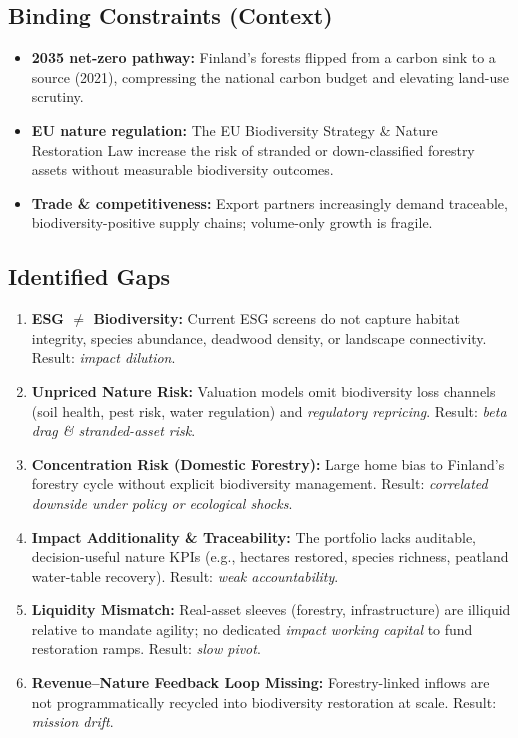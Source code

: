 \subsection*{Binding Constraints (Context)}
\begin{itemize}[leftmargin=*, itemsep=2pt]
    \item \textbf{2035 net-zero pathway:} Finland’s forests flipped from a carbon sink to a source (2021), compressing the national carbon budget and elevating land-use scrutiny.
    \item \textbf{EU nature regulation:} The EU Biodiversity Strategy \& Nature Restoration Law increase the risk of stranded or down-classified forestry assets without measurable biodiversity outcomes.
    \item \textbf{Trade \& competitiveness:} Export partners increasingly demand traceable, biodiversity-positive supply chains; volume-only growth is fragile.
\end{itemize}

\subsection*{Identified Gaps}
\begin{enumerate}[leftmargin=*, itemsep=2pt]
    \item \textbf{ESG $\neq$ Biodiversity:} Current ESG screens do not capture habitat integrity, species abundance, deadwood density, or landscape connectivity. Result: \emph{impact dilution}.
    \item \textbf{Unpriced Nature Risk:} Valuation models omit biodiversity loss channels (soil health, pest risk, water regulation) and \emph{regulatory repricing}. Result: \emph{beta drag \& stranded-asset risk}.
    \item \textbf{Concentration Risk (Domestic Forestry):} Large home bias to Finland’s forestry cycle without explicit biodiversity management. Result: \emph{correlated downside under policy or ecological shocks}.
    \item \textbf{Impact Additionality \& Traceability:} The portfolio lacks auditable, decision-useful nature KPIs (e.g., hectares restored, species richness, peatland water-table recovery). Result: \emph{weak accountability}.
    \item \textbf{Liquidity Mismatch:} Real-asset sleeves (forestry, infrastructure) are illiquid relative to mandate agility; no dedicated \emph{impact working capital} to fund restoration ramps. Result: \emph{slow pivot}.
    \item \textbf{Revenue–Nature Feedback Loop Missing:} Forestry-linked inflows are not programmatically recycled into biodiversity restoration at scale. Result: \emph{mission drift}.
\end{enumerate}

